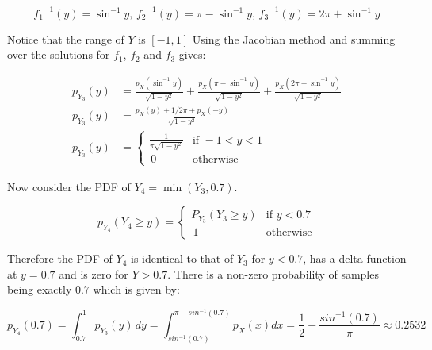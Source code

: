 \documentclass[12pt]{article}
\begin{document}
$$
{f_1}^{-1}(y) = \sin^{-1}{y}\mbox{, }{f_2}^{-1}(y) = \pi - \sin^{-1}{y}\mbox{, }{f_3}^{-1}(y) = 2\pi + \sin^{-1}{y}
$$

Notice that the range of $Y$ is $[-1, 1]$ Using the Jacobian method and summing over the solutions for $f_1$, $f_2$ and $f_3$ gives:

\begin{align}
  p_{Y_3}(y) &= \frac {p_X ( \sin^{-1} y )} {\sqrt{1 - y^2}}
  + \frac {p_X ( \pi - \sin^{-1} y )} {\sqrt{1 - y^2}}
  + \frac {p_X ( 2\pi + \sin^{-1} y )} {\sqrt{1 - y^2}} \\
  p_{Y_3}(y) &= \frac {p_X ( y ) + 1/2\pi + p_X ( -y )} {\sqrt{1 - y^2}} \\
  p_{Y_3}(y) &=
  \begin{cases} 
    \frac 1 {\pi\sqrt{1 - y^2}} &\mbox{if } -1 < y < 1 \\
    \, 0 &\mbox{otherwise}
  \end{cases}
\end{align}

Now consider the PDF of $Y_4 = \min{(Y_3, 0.7)}$.

\begin{equation}
  p_{Y_4}(Y_4 \ge y) =
  \begin{cases} 
    P_{Y_3}(Y_3 \ge y) &\mbox{if } y < 0.7 \\
    \, 1 &\mbox{otherwise}
  \end{cases}
\end{equation}

Therefore the PDF of $Y_4$ is identical to that of $Y_3$ for $y < 0.7$, has a delta function at $y = 0.7$ and is zero for $Y > 0.7$. There is a non-zero probability of samples being exactly $0.7$ which is given by:

$$
  p_{Y_4}(0.7) = 
  \int _ {0.7} ^ 1 p_{Y_3}(y) \, dy = 
  \int _ {sin^{-1}(0.7)} ^ {\pi - sin^{-1}(0.7)} p_X(x) dx =
  \frac 1 2 - \frac {sin^{-1}(0.7)} \pi \approx
  0.2532
$$
\end{document}
